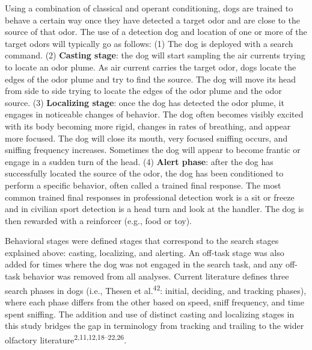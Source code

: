 \documentclass[
]{article}
\begin{document}
Using a combination of classical and operant conditioning, dogs are trained to behave a certain way once they have detected a target odor and are close to the source of that odor. The use of a detection dog and location of one or more of the target odors will typically go as follows: (1) The dog is deployed with a search command. (2) \textbf{Casting stage}: the dog will start sampling the air currents trying to locate an odor plume. As air current carries the target odor, dogs locate the edges of the odor plume and try to find the source. The dog will move its head from side to side trying to locate the edges of the odor plume and the odor source. (3) \textbf{Localizing stage}: once the dog has detected the odor plume, it engages in noticeable changes of behavior. The dog often becomes visibly excited with its body becoming more rigid, changes in rates of breathing, and appear more focused. The dog will close its mouth, very focused sniffing occurs, and sniffing frequency increases. Sometimes the dog will appear to become frantic or engage in a sudden turn of the head. (4) \textbf{Alert phase}: after the dog has successfully located the source of the odor, the dog has been conditioned to perform a specific behavior, often called a trained final response. The most common trained final responses in professional detection work is a sit or freeze and in civilian sport detection is a head turn and look at the handler. The dog is then rewarded with a reinforcer (e.g., food or toy).

Behavioral stages were defined stages that correspond to the search stages explained above: casting, localizing, and alerting. An off-task stage was also added for times where the dog was not engaged in the search task, and any off-task behavior was removed from all analyses. Current literature defines three search phases in dogs (i.e., Thesen et al.\textsuperscript{42}: initial, deciding, and tracking phases), where each phase differs from the other based on speed, sniff frequency, and time spent sniffing. The addition and use of distinct casting and localizing stages in this study bridges the gap in terminology from tracking and trailing to the wider olfactory literature\textsuperscript{2,11,12,18--22,26}.
\end{document}
